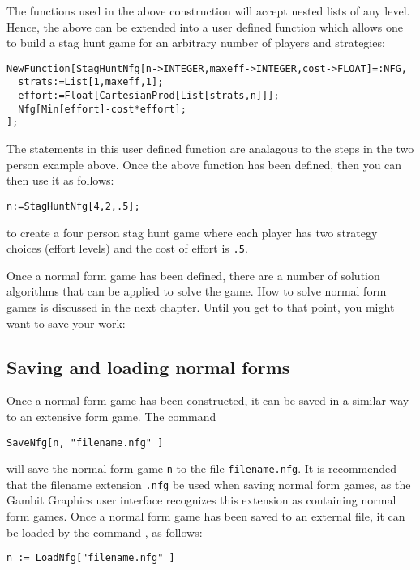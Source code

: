 The functions used in the above construction will accept nested lists
of any level.  Hence, the above can be extended into a user defined
function which allows one to build a stag hunt game for an arbitrary
number of players and strategies:

\begin{verbatim}
NewFunction[StagHuntNfg[n->INTEGER,maxeff->INTEGER,cost->FLOAT]=:NFG,
  strats:=List[1,maxeff,1];
  effort:=Float[CartesianProd[List[strats,n]]];
  Nfg[Min[effort]-cost*effort];
];
\end{verbatim}

\noindent
The statements in this user defined function are analagous to the
steps in the two person example above.  Once the above function has
been defined, then you can then use it as follows:

\begin{verbatim}
n:=StagHuntNfg[4,2,.5];
\end{verbatim}

\noindent
to create a four person stag hunt game where each player has two
strategy choices (effort levels) and the cost of effort is \verb+.5+.

Once a normal form game has been defined, there are a number of
solution algorithms that can be applied to solve the game.  How to
solve normal form games is discussed in the next chapter.  Until you
get to that point, you might want to save your work:

\subsection{Saving and loading normal forms}

Once a normal form game has been constructed, it can be saved in a
similar way to an extensive form game.  The command 

\begin{verbatim}
SaveNfg[n, "filename.nfg" ]
\end{verbatim}

\noindent
will save the normal form game \verb+n+ to the file
\verb+filename.nfg+.  It is recommended that the filename extension
\verb+.nfg+ be used when saving normal form games, as the Gambit
Graphics user interface recognizes this extension as containing normal
form games.  Once a normal form game has been saved to an external
file, it can be loaded by the command , as follows:

\begin{verbatim}
n := LoadNfg["filename.nfg" ]
\end{verbatim}



